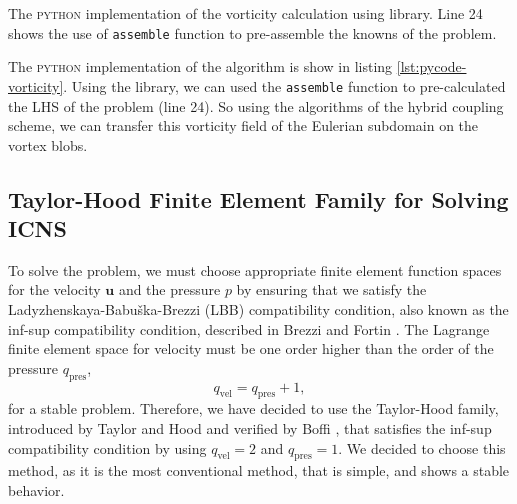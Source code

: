 	\begin{listing}[!t]
	\inputminted[fontseries=courier,obeytabs,fontsize=\footnotesize,mathescape,linenos,numbersep=5pt,frame=lines,framesep=2mm,xleftmargin=20mm,xrightmargin=20mm]{python}{figures/eulerian/vorticity.py}
	\caption{The \textsc{python} implementation of the vorticity calculation using  library. Line 24 shows the use of \texttt{assemble} function to pre-assemble the knowns of the problem.}
	\label{lst:pycode-vorticity}
	\end{listing}

The \textsc{python} implementation of the algorithm is show in listing \ref{lst:pycode-vorticity}. Using the \dolfin library, we can used the \texttt{assemble} function to pre-calculated the LHS of the problem (line 24). So using the algorithms of the hybrid coupling scheme, we can transfer this vorticity field of the Eulerian subdomain on the vortex blobs.

\subsection{Taylor-Hood Finite Element Family for Solving ICNS}
To solve the  problem, we must choose appropriate finite element function spaces for the velocity $\mathbf{u}$ and the pressure $p$ by ensuring that we satisfy the Ladyzhenskaya-Babu\v{s}ka-Brezzi (LBB) compatibility condition, also known as the inf-sup compatibility condition, described in Brezzi and Fortin \cite{Brezzi1991}. The Lagrange finite element space for velocity must be one order higher than the order of the pressure $q_{\mathrm{pres}}$,
	\begin{equation}
	q_{\mathrm{vel}} = 	q_{\mathrm{pres}} + 1,
	\end{equation}
for a stable problem. Therefore, we have decided to use the Taylor-Hood family, introduced by Taylor and Hood \cite{Taylor1973} and verified by Boffi \cite{Boffi1997}, that satisfies the inf-sup compatibility condition by using $q_{\mathrm{vel}} = 2$ and $q_{\mathrm{pres}} = 1$. We decided to choose this method, as it is the most conventional method, that is simple, and shows a stable behavior.

